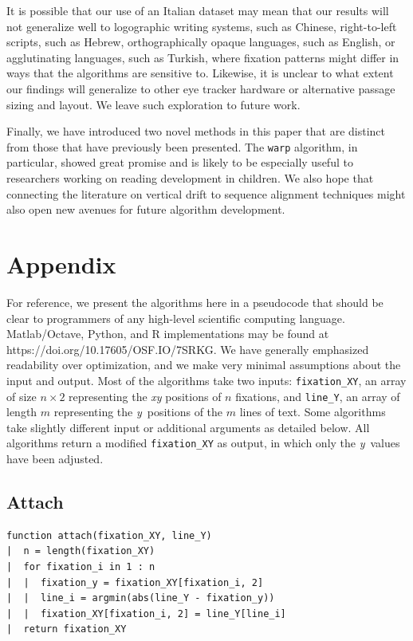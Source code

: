 \documentclass[doc,biblatex]{apa7}
\begin{document}
It is possible that our use of an Italian dataset may mean that our results will not generalize well to logographic writing systems, such as Chinese, right-to-left scripts, such as Hebrew, orthographically opaque languages, such as English, or agglutinating languages, such as Turkish, where fixation patterns might differ in ways that the algorithms are sensitive to. Likewise, it is unclear to what extent our findings will generalize to other eye tracker hardware or alternative passage sizing and layout. We leave such exploration to future work.

Finally, we have introduced two novel methods in this paper that are distinct from those that have previously been presented. The \texttt{warp} algorithm, in particular, showed great promise and is likely to be especially useful to researchers working on reading development in children. We also hope that connecting the literature on vertical drift to sequence alignment techniques might also open new avenues for future algorithm development.

\section{Appendix}

For reference, we present the algorithms here in a pseudocode that should be clear to programmers of any high-level scientific computing language. Matlab/Octave, Python, and R implementations may be found at https://doi.org/10.17605/OSF.IO/7SRKG. We have generally emphasized readability over optimization, and we make very minimal assumptions about the input and output. Most of the algorithms take two inputs: \texttt{fixation\_XY}, an array of size $n \times 2$ representing the \textit{xy} positions of $n$ fixations, and \texttt{line\_Y}, an array of length $m$ representing the \textit{y}~positions of the $m$ lines of text. Some algorithms take slightly different input or additional arguments as detailed below. All algorithms return a modified \texttt{fixation\_XY} as output, in which only the \textit{y}~values have been adjusted.

\subsection{Attach}

\begin{verbatim}
function attach(fixation_XY, line_Y)
|  n = length(fixation_XY)
|  for fixation_i in 1 : n
|  |  fixation_y = fixation_XY[fixation_i, 2]
|  |  line_i = argmin(abs(line_Y - fixation_y))
|  |  fixation_XY[fixation_i, 2] = line_Y[line_i]
|  return fixation_XY
\end{verbatim}
\end{document}
